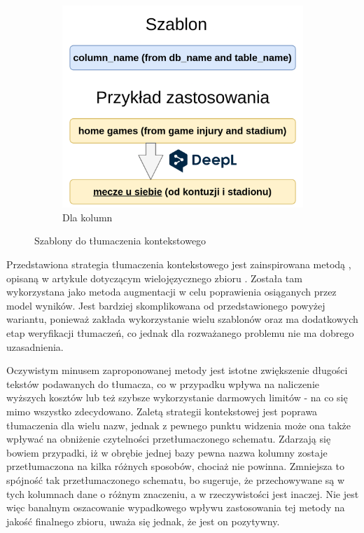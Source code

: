\begin{figure}[ht!]
\begin{subfigure}{0.50\textwidth}
    \includegraphics[width=\textwidth]{images/translation_in_context_column.png}
    \caption{Dla kolumn}
    \label{fig:second}
\end{subfigure}
\caption{Szablony do tłumaczenia kontekstowego}
\label{fig:translation-in-context}
\end{figure}

Przedstawiona strategia tłumaczenia kontekstowego jest zainspirowana metodą , opisaną w artykule dotyczącym wielojęzycznego zbioru  \cite{Dou2022}. Została tam wykorzystana jako metoda augmentacji w celu poprawienia osiąganych przez model wyników. Jest bardziej skomplikowana od przedstawionego powyżej wariantu, ponieważ zakłada wykorzystanie wielu szablonów oraz ma dodatkowych etap weryfikacji tłumaczeń, co jednak dla rozważanego problemu nie ma dobrego uzasadnienia.

Oczywistym minusem zaproponowanej metody jest istotne zwiększenie długości tekstów podawanych do tłumacza, co w przypadku  wpływa na naliczenie wyższych kosztów lub też szybsze wykorzystanie darmowych limitów - na co się mimo wszystko zdecydowano. Zaletą strategii kontekstowej jest poprawa tłumaczenia dla wielu nazw, jednak z pewnego punktu widzenia może ona także wpływać na obniżenie czytelności przetłumaczonego schematu. Zdarzają się bowiem przypadki, iż w obrębie jednej bazy pewna nazwa kolumny zostaje przetłumaczona na kilka różnych sposobów, chociaż nie powinna. Zmniejsza to spójność tak przetłumaczonego schematu, bo sugeruje, że przechowywane są w tych kolumnach dane o różnym znaczeniu, a w rzeczywistości jest inaczej. Nie jest więc banalnym oszacowanie wypadkowego wpływu zastosowania tej metody na jakość finalnego zbioru, uważa się jednak, że jest on pozytywny.

